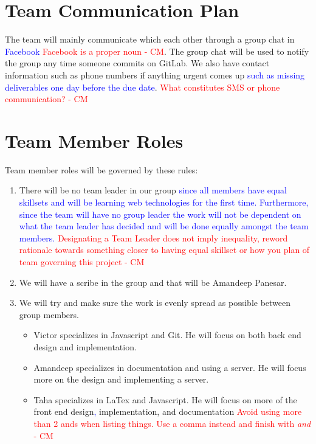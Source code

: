 \documentclass{article}
\begin{document}
\section{Team Communication Plan}
The team will mainly communicate which each other through a group chat in \textcolor{blue}{Facebook} \textcolor{red}{ Facebook is a proper noun - CM}. The group chat will be used to notify the group any time someone commits on GitLab. We also have contact information such as phone numbers if anything urgent comes up \textcolor{blue}{such as missing deliverables one day before the due date}. \textcolor{red}{What constitutes SMS or phone communication?  - CM}
\section{Team Member Roles}
Team member roles will be governed by these rules:
\begin{enumerate}
\item There will be no team leader in our group \textcolor{blue}{since all members have equal skillsets and will be learning web technologies for the first time. Furthermore, since the team will have no group leader the work will not be dependent on what the team leader has decided and will be done equally amongst the team members.} \textcolor{red}{ Designating a Team Leader does not imply inequality, reword rationale towards something closer to having equal skillset or how you plan of team governing this project - CM}
\item We will have a scribe in the group and that will be Amandeep Panesar.
\item We will try and make sure the work is evenly spread as possible between group members.
\begin{itemize}
\item Victor specializes in Javascript and Git. He will focus on both back end design and implementation.
\item Amandeep specializes in documentation and using a server. He will focus more on the design and implementing a server.
\item Taha specializes in LaTex and Javascript. He will focus on more of the front end design\textcolor{blue}{,} implementation, and documentation \textcolor{red}{Avoid using more than 2 ands when listing things. Use a comma instead and finish with \textit{and} - CM}
\end{itemize}
\end{enumerate}
\end{document}
